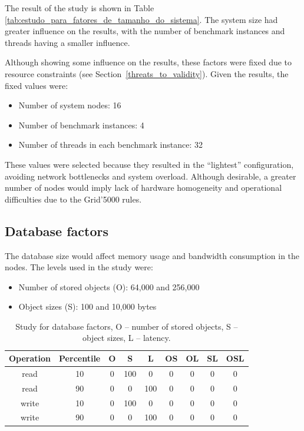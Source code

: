 \documentclass[man,floatsintext,12pt]{apa6}
\begin{document}
The result of the study is shown in Table
\ref{tab:estudo_para_fatores_de_tamanho_do_sistema}. The system size had
greater influence on the results, with the number of benchmark instances and
threads having a smaller influence.

Although showing some influence on the results, these factors were fixed due to
resource constraints (see Section~\ref{threats_to_validity}). Given the results, the fixed values
were:

\begin{itemize}

\item Number of system nodes: 16

\item Number of benchmark instances: 4

\item Number of threads in each benchmark instance: 32

\end{itemize}

These values were selected because they resulted in the ``lightest''
configuration, avoiding network bottlenecks and system overload. Although
desirable, a greater number of nodes would imply lack of hardware homogeneity
and operational difficulties due to the Grid'5000 rules.

\subsection{Database factors}

The database size would affect memory usage and bandwidth consumption in the
nodes. The levels used in the study were:

\begin{itemize}

\item Number of stored objects (O): 64,000 and 256,000

\item Object sizes (S): 100 and 10,000 bytes

\end{itemize}

\begin{table}[h!]
  \caption{Study for database factors, O -- number of stored objects, S -- object
sizes, L -- latency.}
  \begin{tabular}{ccccccccc}         \toprule
Operation & Percentile & O & S & L & OS & OL & SL & OSL\\ \midrule

read & 10 & 0 & 100 & 0 & 0 & 0 & 0 & 0 \\

read & 90 & 0 & 0 & 100 & 0 & 0 & 0 & 0 \\

write & 10 & 0 & 100 & 0 & 0 & 0 & 0 & 0 \\

write & 90 & 0 & 0 & 100 & 0 & 0 & 0 & 0 \\ \bottomrule
  \end{tabular}
  \label{tab:estudo_para_fatores_de_banco_de_dados}
\end{table}
\end{document}
